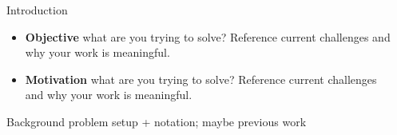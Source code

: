 \documentclass[final]{beamer}
\newlength{\sepwidth}
\newlength{\colwidth}
\newcommand{\separatorcolumn}{\begin{column}{\sepwidth}\end{column}}
\begin{document}
\begin{frame}[t]
\begin{columns}[t]
\separatorcolumn

\begin{column}{\colwidth}

  \begin{block}{Introduction}
    \begin{itemize}
        \item \textbf{Objective} what are you trying to solve? Reference current challenges and why your work is meaningful.
        \item \textbf{Motivation} what are you trying to solve? Reference current challenges and why your work is meaningful.
    \end{itemize}
  \end{block}

  \begin{block}{Background}
  problem setup + notation; maybe previous work
  \end{block}
  

\end{column}
\end{columns}
\end{frame}
\end{document}
